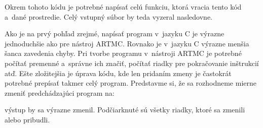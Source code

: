 \noindent
Okrem tohoto kódu je potrebné napísať celú funkciu, ktorá vracia tento kód a~dané prostredie.
Celý vstupný súbor by teda vyzeral nasledovne.


\noindent
Ako je na prvý pohľad zrejmé, napísať program v~jazyku C je výrazne jednoduchšie ako pre nástroj ARTMC. Rovnako je v~jazyku C výrazne menšia šanca zavedenia chyby. Pri tvorbe programu v~nástroji ARTMC je potrebné počítať premenné a~správne ich značiť, počítať riadky pre pokračovanie inštrukcií atď. Ešte zložitejšia je úprava kódu, kde len pridaním zmeny je častokrát potrebné prepísať takmer celý program. Predstavme si, že sa rozhodneme mierne zmeniť predchádzajúci program na:


\noindent
výstup by sa výrazne zmenil. Podčiarknuté sú všetky riadky, ktoré sa zmenili alebo pribudli.


